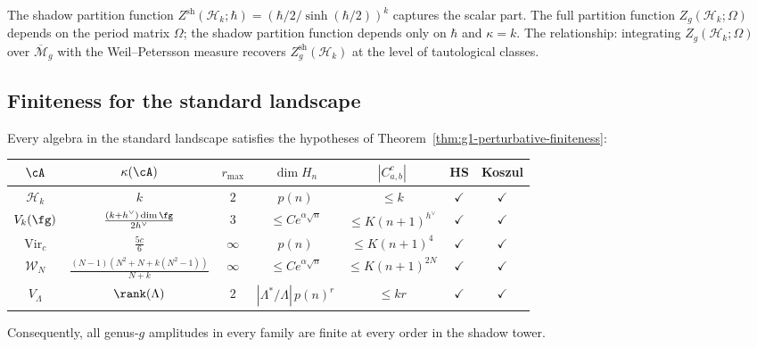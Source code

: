 \begin{remark}%
\label{rem:g1-heisenberg-comparison}%
%
The shadow partition function
$Z^{\mathrm{sh}}(\mathcal{H}_k;\hbar) =
(\hbar/2/\sinh(\hbar/2))^k$ captures the scalar part.
The full partition function $Z_g(\mathcal{H}_k;\Omega)$
depends on the period matrix $\Omega$; the shadow partition
function depends only on $\hbar$ and $\kappa = k$.
The relationship: integrating
$Z_g(\mathcal{H}_k;\Omega)$ over
$\overline{\mathcal{M}}_g$ with the Weil--Petersson measure
recovers $Z^{\mathrm{sh}}_g(\mathcal{H}_k)$ at the level
of tautological classes.
\end{remark}

%
%

\subsection{Finiteness for the standard landscape}
\label{subsec:thqg-I-standard-landscape}

\begin{theorem}%
\label{thm:g1-finiteness-landscape}%
%
Every algebra in the standard landscape satisfies the hypotheses
of Theorem~\textup{\ref{thm:g1-perturbative-finiteness}}:
\begin{center}
\renewcommand{\arraystretch}{1.4}
\begin{tabular}{c|c|c|c|c|c|c}
$\cA$ & $\kappa(\cA)$ & $r_{\max}$ & $\dim H_n$
  & $|C_{a,b}^c|$ & HS & Koszul
\\[2pt]\hline\hline
$\mathcal{H}_k$ & $k$ & $2$
  & $p(n)$ & $\leq k$ & $\checkmark$ & $\checkmark$
\\
$V_k(\fg)$ &
  $\frac{(k{+}h^\vee)\dim\fg}{2h^\vee}$
  & $3$ & $\leq Ce^{\alpha\sqrt{n}}$
  & $\leq K(n{+}1)^{h^\vee}$ & $\checkmark$ & $\checkmark$
\\
$\mathrm{Vir}_c$ & $\frac{5c}{6}$
  & $\infty$ & $p(n)$
  & $\leq K(n{+}1)^4$ & $\checkmark$ & $\checkmark$
\\
$\mathcal{W}_N$ &
  $\frac{(N{-}1)(N^2{+}N{+}k(N^2{-}1))}{N+k}$
  & $\infty$ & $\leq Ce^{\alpha\sqrt{n}}$
  & $\leq K(n{+}1)^{2N}$ & $\checkmark$ & $\checkmark$
\\
$V_\Lambda$ & $\rank(\Lambda)$ & $2$
  & $|\Lambda^*/\Lambda|\,p(n)^r$
  & $\leq kr$ & $\checkmark$ & $\checkmark$
\end{tabular}
\end{center}
Consequently, all genus-$g$ amplitudes in every family are finite
at every order in the shadow tower.
\end{theorem}

